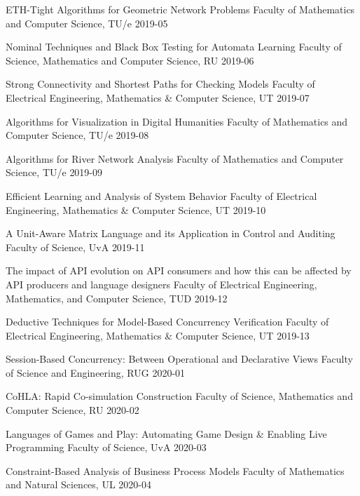 \begin{multicols}{2}
         {ETH-Tight Algorithms for Geometric Network Problems}
         {Faculty of Mathematics and Computer Science, TU/e}
         {2019-05}

         {Nominal Techniques and Black Box Testing for Automata Learning}
         {Faculty of Science, Mathematics and Computer Science, RU}
         {2019-06}

         {Strong Connectivity and Shortest Paths for Checking Models}
         {Faculty of Electrical Engineering, Mathematics \& Computer Science, UT}
         {2019-07}

         {Algorithms for Visualization in Digital Humanities}
         {Faculty of Mathematics and Computer Science, TU/e}
         {2019-08}

         {Algorithms for River Network Analysis}
         {Faculty of Mathematics and Computer Science, TU/e}
         {2019-09}

         {Efficient Learning and Analysis of System Behavior}
         {Faculty of Electrical Engineering, Mathematics \& Computer Science, UT}
         {2019-10}

         {A Unit-Aware Matrix Language and its Application in Control and Auditing}
         {Faculty of Science, UvA}
         {2019-11}
		 
         {The impact of API evolution on API consumers and how this can be affected by API producers and language
designers}
         {Faculty of Electrical Engineering, Mathematics, and Computer Science, TUD}
         {2019-12}

         {Deductive Techniques for Model-Based Concurrency Verification}
         {Faculty of Electrical Engineering, Mathematics \& Computer Science, UT}
         {2019-13}

         {Session-Based Concurrency: Between Operational and Declarative Views}
         {Faculty of Science and Engineering, RUG}
         {2020-01}

         {CoHLA: Rapid Co-simulation Construction}
         {Faculty of Science, Mathematics and Computer Science, RU}
         {2020-02}

         {Languages of Games and Play: Automating Game Design \& Enabling Live Programming}
         {Faculty of Science, UvA}
         {2020-03}

         {Constraint-Based Analysis of Business Process Models}
         {Faculty of Mathematics and Natural Sciences, UL}
         {2020-04}

\end{multicols}
